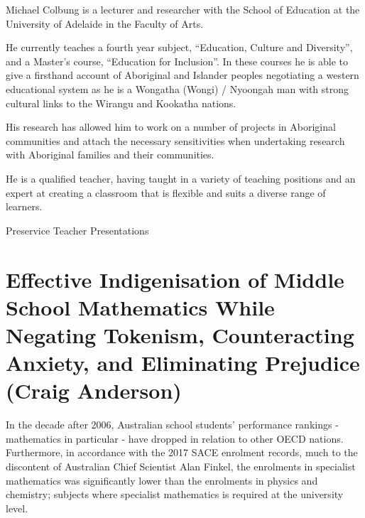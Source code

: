 \documentclass[twoside,12pt,a4paper,notitlepage]{memoir}
\begin{document}
Michael Colbung is a lecturer and researcher with the School of Education at the University of Adelaide in the Faculty of Arts. 

He currently teaches a fourth year subject, “Education, Culture and Diversity”, and a Master’s course, “Education for Inclusion”. In these courses he is able to give a firsthand account of Aboriginal and Islander peoples negotiating a western educational system as he is a Wongatha (Wongi) / Nyoongah man with strong cultural links to the Wirangu and Kookatha nations.

His research has allowed him to work on a number of projects in Aboriginal communities and attach the necessary sensitivities when undertaking research with Aboriginal families and their communities.

He is a qualified teacher, having taught in a variety of teaching positions and an expert at creating a classroom that is flexible and suits a diverse range of learners.
\vfill



\clearpage{}
\vspace*{2cm}
{\Huge Preservice Teacher Presentations}
\vspace{2cm}


\section*{Effective Indigenisation of Middle School Mathematics While Negating Tokenism, Counteracting Anxiety, and Eliminating Prejudice (Craig Anderson)}
\label{aut:anderson}

In the decade after 2006, Australian school students’ performance rankings - mathematics in particular - have dropped in relation to other OECD nations. Furthermore, in accordance with the 2017 SACE enrolment records, much to the discontent of Australian Chief Scientist Alan Finkel, the enrolments in specialist mathematics was significantly lower than the enrolments in physics and chemistry; subjects where specialist mathematics is required at the university level.
\end{document}
